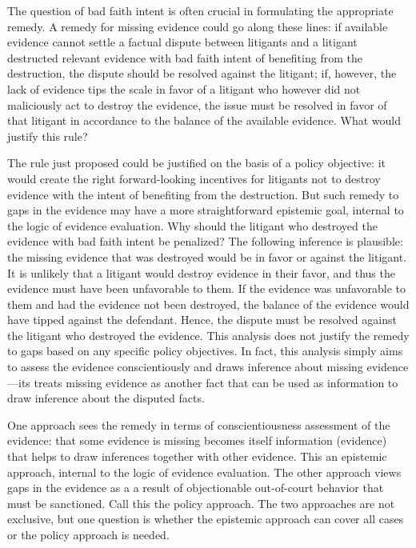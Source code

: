 \documentclass[
  10pt,
  dvipsnames,enabledeprecatedfontcommands]{scrartcl}
\begin{document}
The question of bad faith intent is often crucial in formulating the
appropriate remedy. A remedy for missing evidence could go along these
lines: if available evidence cannot settle a factual dispute between
litigants and a litigant destructed relevant evidence with bad faith
intent of benefiting from the destruction, the dispute should be
resolved against the litigant; if, however, the lack of evidence tips
the scale in favor of a litigant who however did not maliciously act to
destroy the evidence, the issue must be resolved in favor of that
litigant in accordance to the balance of the available evidence. What
would justify this rule?

The rule just proposed could be justified on the basis of a policy
objective: it would create the right forward-looking incentives for
litigants not to destroy evidence with the intent of benefiting from the
destruction. But such remedy to gaps in the evidence may have a more
straightforward epistemic goal, internal to the logic of evidence
evaluation. Why should the litigant who destroyed the evidence with bad
faith intent be penalized? The following inference is plausible: the
missing evidence that was destroyed would be in favor or against the
litigant. It is unlikely that a litigant would destroy evidence in their
favor, and thus the evidence must have been unfavorable to them. If the
evidence was unfavorable to them and had the evidence not been
destroyed, the balance of the evidence would have tipped against the
defendant. Hence, the dispute must be resolved against the litigant who
destroyed the evidence. This analysis does not justify the remedy to
gaps based on any specific policy objectives. In fact, this analysis
simply aims to assess the evidence conscientiously and draws inference
about missing evidence---its treats missing evidence as another fact
that can be used as information to draw inference about the disputed
facts.

One approach sees the remedy in terms of conscientiousness assessment of
the evidence: that some evidence is missing becomes itself information
(evidence) that helps to draw inferences together with other evidence.
This an epistemic approach, internal to the logic of evidence
evaluation. The other approach views gaps in the evidence as a a result
of objectionable out-of-court behavior that must be sanctioned. Call
this the policy approach. The two approaches are not exclusive, but one
question is whether the epistemic approach can cover all cases or the
policy approach is needed.
\end{document}
